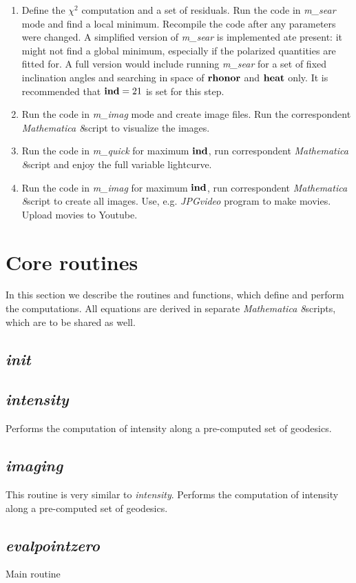 \documentclass{emulateapj}
\newcommand{\mat}{\textit{Mathematica 8}}
\begin{document}
\begin{enumerate}
\item{Define the $\chi^2$ computation and a set of residuals.  Run the code in \textit{m\_sear} mode and find a local minimum. Recompile the code after any parameters were changed.
A simplified version of \textit{m\_sear} is implemented ate present: it might not find a global minimum, especially if the polarized quantities are fitted for.
A full version would include running \textit{m\_sear} for a set of fixed inclination angles and searching in space of $\bf rhonor$ and $\bf heat$ only.
It is recommended that ${\bf ind}=21$ is set for this step.}
\item{Run the code in \textit{m\_imag} mode and create image files. Run the correspondent \mat script to visualize the images.}
\item{Run the code in \textit{m\_quick} for maximum $\bf ind$, run correspondent \mat script and enjoy the full variable lightcurve.}
\item{Run the code in \textit{m\_imag} for maximum $\bf ind$, run correspondent \mat script to create all images. Use, e.g. \textit{JPGvideo} program to make movies.
Upload movies to Youtube.}
\end{enumerate}

\section{Core routines}
In this section we describe the routines and functions, which define and perform the computations.
All equations are derived in separate \mat  scripts, which are to be shared as well.
\subsection{\textit{init}}
\subsection{\textit{intensity}}
Performs the computation of intensity along a pre-computed set of geodesics.
\subsection{\textit{imaging}}
This routine is very similar to \textit{intensity}.
Performs the computation of intensity along a pre-computed set of geodesics.
\subsection{\textit{evalpointzero}}
Main routine
\end{document}
